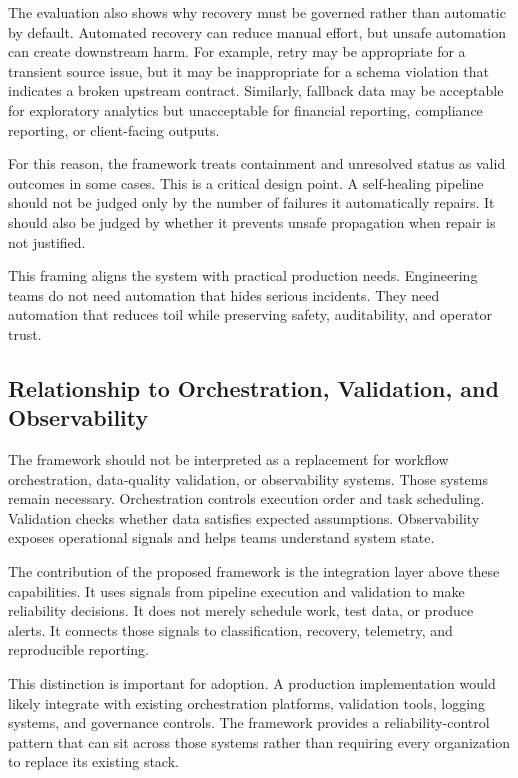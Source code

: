 The evaluation also shows why recovery must be governed rather than automatic by default. Automated recovery can reduce manual effort, but unsafe automation can create downstream harm. For example, retry may be appropriate for a transient source issue, but it may be inappropriate for a schema violation that indicates a broken upstream contract. Similarly, fallback data may be acceptable for exploratory analytics but unacceptable for financial reporting, compliance reporting, or client-facing outputs.

For this reason, the framework treats containment and unresolved status as valid outcomes in some cases. This is a critical design point. A self-healing pipeline should not be judged only by the number of failures it automatically repairs. It should also be judged by whether it prevents unsafe propagation when repair is not justified.

This framing aligns the system with practical production needs. Engineering teams do not need automation that hides serious incidents. They need automation that reduces toil while preserving safety, auditability, and operator trust.

\subsection{Relationship to Orchestration, Validation, and Observability}

The framework should not be interpreted as a replacement for workflow orchestration, data-quality validation, or observability systems. Those systems remain necessary. Orchestration controls execution order and task scheduling. Validation checks whether data satisfies expected assumptions. Observability exposes operational signals and helps teams understand system state.

The contribution of the proposed framework is the integration layer above these capabilities. It uses signals from pipeline execution and validation to make reliability decisions. It does not merely schedule work, test data, or produce alerts. It connects those signals to classification, recovery, telemetry, and reproducible reporting.

This distinction is important for adoption. A production implementation would likely integrate with existing orchestration platforms, validation tools, logging systems, and governance controls. The framework provides a reliability-control pattern that can sit across those systems rather than requiring every organization to replace its existing stack.

